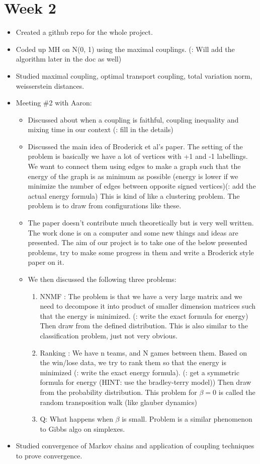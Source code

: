 \documentclass{article}
\begin{document}
	\section{Week 2}
		\begin{itemize}
			\item Created a github repo for the whole project.
			\item Coded up MH on N(0, 1) using the maximal couplings. (\todo: Will add the algorithm later in the doc as well)
			\item Studied maximal coupling, optimal transport coupling, total variation norm, weisserstein distances.
			\item Meeting \#2 with Aaron:
				\begin{itemize}
					\item Discussed about when a coupling is faithful, coupling inequality and mixing time in our context (\todo: fill in the details)
					\item Discussed the main idea of Broderick et al's paper. The setting of the problem is basically we have a lot of vertices with +1 and -1 labellings.
					We want to connect them using edges to make a graph such that the energy of the graph is as minimum as possible (energy is lower if we minimize the number of edges between opposite signed vertices)(\todo: add the actual energy formula)
					This is kind of like a clustering problem. The problem is to draw from configurations like these.
					\item The paper doesn't contribute much theoretically but is very well written. The work done is on a computer and some new things and ideas are presented. The aim of our project is to take one of the below presented problems, try to make some progress in them and write a Broderick style paper on it.
					\item We then discussed the following three problems:
						\begin{enumerate}
							\item NNMF : The problem is that we have a very large matrix and we need to decompose it into product of smaller dimension matrices such that the energy is minimized. (\todo: write the exact formula for energy) Then draw from the defined distribution. This is also similar to the classification problem, just not very obvious.
							\item Ranking : We have n teams, and N games between them. Based on the win/lose data, we try to rank them so that the energy is minimized (\todo: write the exact energy formula). (\todo: get a symmetric formula for energy (HINT: use the bradley-terry model)) Then draw from the probability distribution.
							This problem for $\beta = 0$ is called the random transposition walk (like glauber dynamics)
							\item Q: What happens when $\beta$ is small. Problem is a similar phenomenon to Gibbs algo on simplexes.
						\end{enumerate}
				\end{itemize}
			\item Studied convergence of Markov chains and application of coupling techniques to prove convergence.
		\end{itemize}
\end{document}
